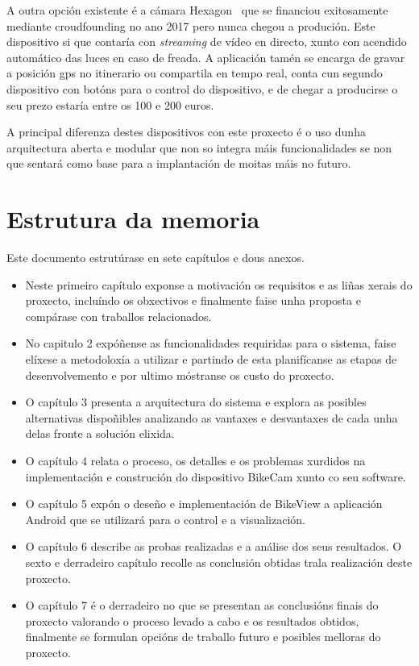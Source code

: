  A outra opción existente é a cámara Hexagon~\cite{HEXAGONCameraSignals} que se financiou exitosamente mediante croudfounding no ano 2017 pero nunca chegou a produción. Este dispositivo si que contaría con \emph{streaming} de vídeo en directo, xunto con acendido automático das luces en caso de freada. A aplicación tamén se encarga de gravar a posición gps no itinerario ou compartila en tempo real, conta cun segundo dispositivo con botóns para o control do dispositivo, e de chegar a producirse o seu prezo estaría entre os 100 e 200 euros.

 A principal diferenza destes dispositivos con este proxecto é o uso dunha arquitectura aberta e modular que non so integra máis funcionalidades se non que sentará como base para a implantación de moitas máis no futuro.


\section{Estrutura da memoria}
Este documento estrutúrase en sete capítulos e dous anexos.
\begin{itemize}
  \item Neste primeiro capítulo exponse a motivación os requisitos e as liñas xerais do proxecto, incluíndo os obxectivos e finalmente faise unha proposta e compárase con traballos relacionados.
  \item No capitulo 2 expóñense as funcionalidades requiridas para o sistema, faise elíxese a metodoloxía a utilizar e partindo de esta planifícanse as etapas de desenvolvemento e por ultimo móstranse os custo do proxecto.
  \item O capítulo 3 presenta a arquitectura do sistema e explora as posibles alternativas dispoñibles analizando as vantaxes e desvantaxes de cada unha delas fronte a solución elixida.
  \item O capítulo 4 relata o proceso, os detalles e os problemas xurdidos na implementación e construción do dispositivo BikeCam xunto co seu software.
  \item O capítulo 5 expón o deseño e implementación de BikeView a aplicación Android que se utilizará para o control e a visualización.
  \item O capítulo 6 describe as probas realizadas e a análise dos seus resultados. O sexto e derradeiro capítulo recolle as conclusión obtidas trala realización deste proxecto.
  \item O capítulo 7 é o derradeiro no que se presentan as conclusións finais do proxecto valorando o proceso levado a cabo e os resultados obtidos, finalmente se formulan opcións de traballo futuro e posibles melloras do proxecto.
\end{itemize}
